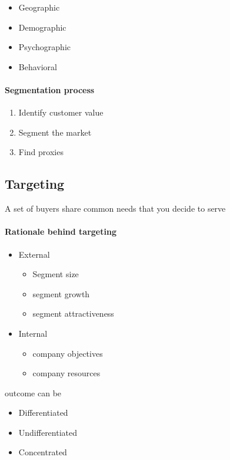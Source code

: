 \documentclass[a4paper,titlepage] {scrartcl}
\begin{document}
\begin{itemize}
	\item Geographic
	\item Demographic
	\item Psychographic
	\item Behavioral
\end{itemize}


\paragraph{Segmentation process} %
\label{par:segmentation_process}
\begin{enumerate}
	\item Identify customer value
	\item Segment the market
	\item Find proxies
\end{enumerate}



\subsection{Targeting}

A set of buyers share common needs that you decide to serve

\paragraph{Rationale behind targeting} %
\label{par:rationale_behind_targeting}
\begin{itemize}
	\item External
	\begin{itemize}
		\item Segment size
		\item segment growth
		\item segment attractiveness
	\end{itemize}
	\item Internal
	\begin{itemize}
		\item company objectives
		\item company resources
	\end{itemize}
\end{itemize}

outcome can be
\begin{itemize}
	\item Differentiated
	\item Undifferentiated
	\item Concentrated
\end{itemize}
\end{document}
